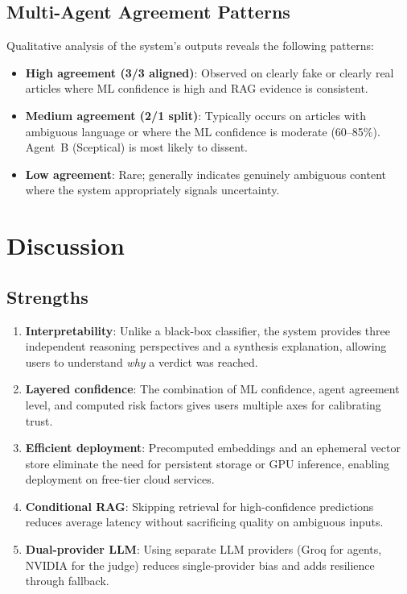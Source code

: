 \documentclass[12pt, a4paper]{article}
\begin{document}
\subsection{Multi-Agent Agreement Patterns}

Qualitative analysis of the system's outputs reveals the following patterns:

\begin{itemize}[leftmargin=2em]
    \item \textbf{High agreement (3/3 aligned)}: Observed on clearly fake
          or clearly real articles where ML confidence is high and RAG
          evidence is consistent.
    \item \textbf{Medium agreement (2/1 split)}: Typically occurs on
          articles with ambiguous language or where the ML confidence is
          moderate (60--85\%). Agent~B (Sceptical) is most likely to
          dissent.
    \item \textbf{Low agreement}: Rare; generally indicates genuinely
          ambiguous content where the system appropriately signals
          uncertainty.
\end{itemize}


\section{Discussion}

\subsection{Strengths}

\begin{enumerate}[leftmargin=2em]
    \item \textbf{Interpretability}: Unlike a black-box classifier, the
          system provides three independent reasoning perspectives and a
          synthesis explanation, allowing users to understand \emph{why} a
          verdict was reached.
    \item \textbf{Layered confidence}: The combination of ML confidence,
          agent agreement level, and computed risk factors gives users
          multiple axes for calibrating trust.
    \item \textbf{Efficient deployment}: Precomputed embeddings and an
          ephemeral vector store eliminate the need for persistent storage
          or GPU inference, enabling deployment on free-tier cloud services.
    \item \textbf{Conditional RAG}: Skipping retrieval for high-confidence
          predictions reduces average latency without sacrificing quality
          on ambiguous inputs.
    \item \textbf{Dual-provider LLM}: Using separate LLM providers (Groq
          for agents, NVIDIA for the judge) reduces single-provider bias
          and adds resilience through fallback.
\end{enumerate}
\end{document}
